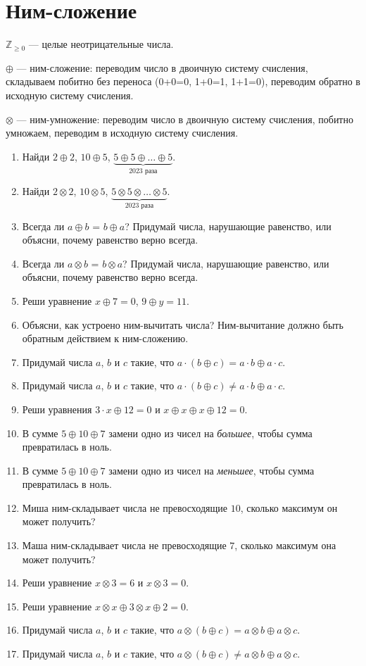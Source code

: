 \documentclass[12pt]{article}
\theoremstyle{definition}
\begin{document}
\section{Ним-сложение}

$\mathbb{Z}_{\geq 0}$ — целые неотрицательные числа.

$\oplus$ — ним-сложение: переводим число в двоичную систему счисления, складываем побитно без переноса (0+0=0, 1+0=1, 1+1=0), 
переводим обратно в исходную систему счисления. 

$\otimes$ — ним-умножение: переводим число в двоичную систему счисления, побитно умножаем, 
переводим в исходную систему счисления. 

\begin{enumerate}
  \item Найди $2 \oplus 2$, $10 \oplus 5$, $\underbrace{5 \oplus 5 \oplus \ldots \oplus 5}_{2023 \text{ раза}}$.
  \item Найди $2 \otimes 2$, $10 \otimes 5$, $\underbrace{5 \otimes 5 \otimes \ldots \otimes 5}_{2023 \text{ раза}}$.
  \item Всегда ли $a \oplus b$ = $b \oplus a$? 
  Придумай числа, нарушающие равенство, или объясни, почему равенство верно всегда. 
  \item Всегда ли $a \otimes b$ = $b \otimes a$? 
  Придумай числа, нарушающие равенство, или объясни, почему равенство верно всегда. 
  \item Реши уравнение $x \oplus 7 = 0$, $9 \oplus y = 11$. 
  \item Объясни, как устроено ним-вычитать числа? 
  Ним-вычитание должно быть обратным действием к ним-сложению.
  \item Придумай числа $a$, $b$ и $c$ такие, что $a\cdot (b\oplus c) = a\cdot b \oplus a\cdot c$.
  \item Придумай числа $a$, $b$ и $c$ такие, что $a\cdot (b\oplus c) \neq a\cdot b \oplus a\cdot c$.
  \item Реши уравнения $3\cdot x \oplus 12 = 0$ и $x \oplus x \oplus x \oplus 12 = 0$.
  \item В сумме $5 \oplus 10 \oplus 7$ замени одно из чисел на \textit{большее}, чтобы сумма превратилась в ноль.
  \item В сумме $5 \oplus 10 \oplus 7$ замени одно из чисел на \textit{меньшее}, чтобы сумма превратилась в ноль.
  \item Миша ним-складывает числа не превосходящие $10$, сколько максимум он может получить?
  \item Маша ним-складывает числа не превосходящие $7$, сколько максимум она может получить?
  \item Реши уравнение $x \otimes 3 = 6$ и $x \otimes 3 = 0$.
  \item Реши уравнение $x \otimes x \oplus 3 \otimes x \oplus 2 = 0$.
  \item Придумай числа $a$, $b$ и $c$ такие, что $a\otimes (b\oplus c) = a\otimes b \oplus a\otimes c$.
  \item Придумай числа $a$, $b$ и $c$ такие, что $a\otimes (b\oplus c) \neq a\otimes b \oplus a\otimes c$.
\end{enumerate}
\end{document}
